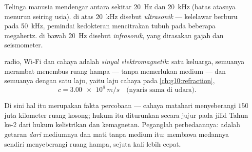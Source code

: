 \begin{definition}\label{def:g10:signals-and-waves:ultrasound}
Telinga manusia mendengar  antara sekitar \qty{20}{Hz} dan
\qty{20}{kHz} (batas atasnya menurun seiring usia).  di atas
\qty{20}{kHz} disebut \emph{ultrasonik} --- kelelawar
berburu pada \qty{50}{kHz}, pemindai kedokteran mencitrakan tubuh pada
beberapa megahertz.  di bawah \qty{20}{Hz} disebut
\emph{infrasonik}, yang dirasakan gajah dan
seismometer.
\end{definition}

\begin{proposition}\label{prop:g10:signals-and-waves:em}
 radio, Wi-Fi dan cahaya adalah \emph{sinyal
elektromagnetik}: satu keluarga, semuanya
merambat menembus ruang hampa --- tanpa memerlukan medium --- dan
semuanya dengan satu laju, yaitu laju cahaya pada
\cref{ch:g10:refraction},
\[
c = \qty{3.00e8}{m/s} \quad \text{(nyaris sama di udara).}
\]
\end{proposition}
\admitted

\begin{remark}\label{rem:g10:signals-and-waves:honest}
Di sini hal itu merupakan fakta percobaan --- cahaya matahari
menyeberangi $150$ juta kilometer ruang kosong; hukum itu diturunkan
secara jujur pada jilid Tahun ke-2 dari hukum kelistrikan dan
kemagnetan. Peganglah perbedaannya:  adalah getaran \emph{dari}
mediumnya dan mati tanpa medium itu;  membawa
medannya sendiri menyeberangi ruang hampa, sejuta kali lebih cepat.
\end{remark}

